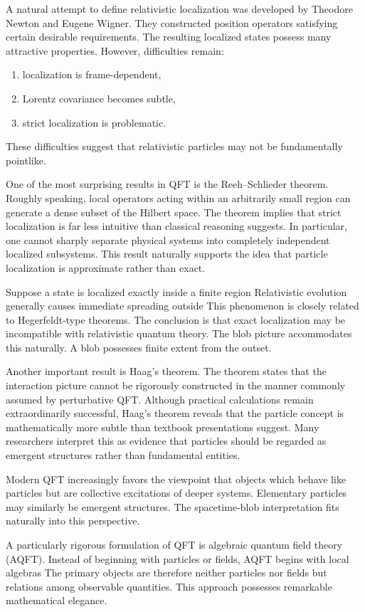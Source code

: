 A natural attempt to define relativistic localization was developed by
Theodore Newton and Eugene Wigner.
They constructed position operators satisfying certain desirable
requirements.
The resulting localized states possess many attractive properties.
However, difficulties remain:
\begin{enumerate}
\item localization is frame-dependent,
\item Lorentz covariance becomes subtle,
\item strict localization is problematic.
\end{enumerate}
These difficulties suggest that relativistic particles may not be
fundamentally pointlike.

One of the most surprising results in QFT is the
Reeh--Schlieder theorem.
Roughly speaking, local operators acting within an arbitrarily small
region can generate a dense subset of the Hilbert space.
The theorem implies that strict localization is far less intuitive than
classical reasoning suggests.
In particular, one cannot sharply separate physical systems into
completely independent localized subsystems.
This result naturally supports the idea that particle localization is
approximate rather than exact.

Suppose a state is localized exactly inside a finite region
Relativistic evolution generally causes immediate spreading outside
This phenomenon is closely related to Hegerfeldt-type theorems.
The conclusion is that exact localization may be incompatible with
relativistic quantum theory.
The blob picture accommodates this naturally.
A blob possesses finite extent from the outset.

Another important result is Haag's theorem.
The theorem states that the interaction picture cannot be rigorously
constructed in the manner commonly assumed by perturbative QFT.
Although practical calculations remain extraordinarily successful,
Haag's theorem reveals that the particle concept is mathematically more
subtle than textbook presentations suggest.
Many researchers interpret this as evidence that particles should be
regarded as emergent structures rather than fundamental entities.

Modern QFT increasingly favors the viewpoint
that objects which behave like particles but are collective excitations of
deeper systems.
Elementary particles may similarly be emergent structures.
The spacetime-blob interpretation fits naturally into this perspective.

A particularly rigorous formulation of QFT is algebraic quantum field
theory (AQFT).
Instead of beginning with particles or fields, AQFT begins with local
algebras
The primary objects are therefore neither particles nor fields but
relations among observable quantities.
This approach possesses remarkable mathematical elegance.

